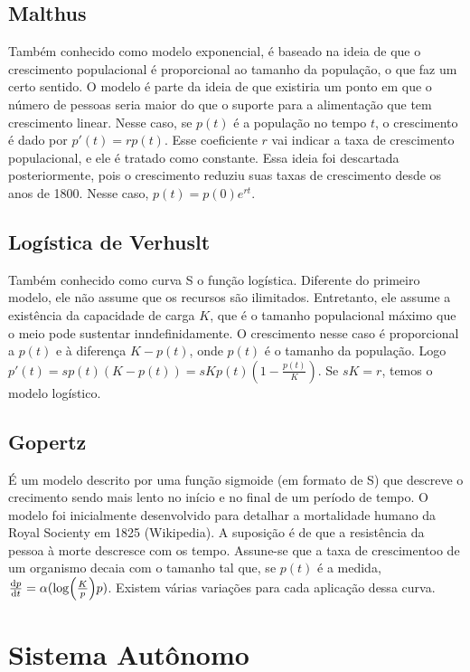 \documentclass[12pt]{article}
\begin{document}
\subsection{Malthus} 
Também conhecido como modelo exponencial, é
baseado na ideia de que o crescimento populacional é proporcional ao
tamanho da população, o que faz um certo sentido. O modelo é parte da
ideia de que existiria um ponto em que o número de pessoas seria maior do
que o suporte para a alimentação que tem crescimento linear. Nesse caso,
se $p(t)$ é a população no tempo $t$, o crescimento é dado por $p'(t) =
rp(t)$. Esse coeficiente $r$ vai indicar a taxa de crescimento
populacional, e ele é tratado como constante. Essa ideia foi descartada
posteriormente, pois o crescimento reduziu suas taxas de crescimento desde
os anos de 1800. Nesse caso, $p(t) = p(0)e^{rt}$. 

\subsection{Logística de Verhuslt} 

Também conhecido como curva S o função logística. Diferente do primeiro
modelo, ele não assume que os
recursos são ilimitados. Entretanto, ele assume a existência da capacidade
de carga $K$, que é o tamanho populacional máximo que o meio pode
sustentar inndefinidamente. O crescimento nesse caso é proporcional a
$p(t)$ e à diferença $K - p(t)$, onde $p(t)$ é o tamanho da população.
Logo $p'(t) = sp(t)(K - p(t)) = sKp(t)(1 - \frac{p(t)}{K})$. Se $sK = r$,
temos o modelo logístico.

\subsection{Gopertz}

É um modelo descrito por uma função sigmoide (em formato de S) que descreve o
crecimento sendo mais lento no início e no final de um período de tempo. O
modelo foi inicialmente desenvolvido para detalhar a mortalidade humano da
Royal Socienty em 1825 (Wikipedia). A suposição é de que a resistência da pessoa à morte
descresce com os tempo. Assune-se que a taxa de crescimentoo de um organismo
decaia com o tamanho tal que, se $p(t)$ é a medida, $\dv{p}{t} =
\alpha(\log(\frac{K}{p})p)$. Existem várias variações para cada aplicação
dessa curva. 

\section{Sistema Autônomo}
\end{document}
